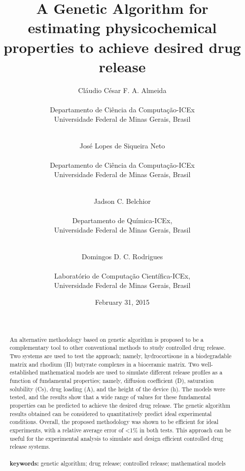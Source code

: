 \documentclass{article}%
\begin{document}
\title{A Genetic Algorithm for estimating physicochemical properties to achieve desired drug release}

\author{
	Cláudio César F. A. Almeida
	\\
	\\Departamento de Ciência da Computação-ICEx
	\\Universidade Federal de Minas Gerais, Brasil
	\and
	\\José Lopes de Siqueira Neto
	\\
	\\Departamento de Ciência da Computação-ICEx
	\\Universidade Federal de Minas Gerais, Brasil
	\and
	\\Jadson C. Belchior
	\\
	\\Departamento de Química-ICEx,
	\\Universidade Federal de Minas Gerais, Brasil
	\and
	\\Domingos D. C. Rodrigues
	\\
	\\Laboratório de Computação Científica-ICEx,
	\\Universidade Federal de Minas Gerais, Brasil
}

\date{February 31, 2015}
\maketitle

\begin{abstract}
\\\cite{ahu61}
\\
An alternative methodology based on genetic algorithm is proposed to be a complementary tool to other conventional methods to study controlled drug release. Two systems are used to test the approach; namely, hydrocortisone in a biodegradable matrix and rhodium (II) butyrate complexes in a bioceramic matrix. Two well-established mathematical models are used to simulate different release profiles
as a function of fundamental properties; namely, diffusion coefficient (D), saturation
solubility (Cs), drug loading (A), and the height of the device (h). The models were tested,
and the results show that a wide range of values for these fundamental properties can be predicted to achieve the desired drug release. The genetic algorithm results obtained can be considered to quantitatively predict ideal experimental conditions. Overall, the proposed methodology was shown to be efficient for ideal experiments, with a relative average error of <1\% in both tests. This approach can be useful for the experimental analysis to simulate and design efficient controlled drug release systems.
\\
\\\textbf{keywords:} genetic algorithm; drug release; controlled release; mathematical models
\end{abstract}
\end{document}
